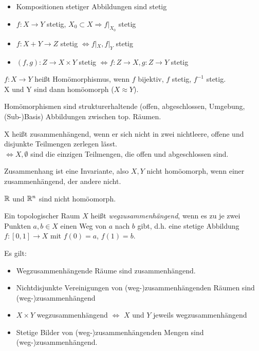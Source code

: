 \begin{bem}
  \begin{itemize}
    \item Kompositionen stetiger Abbildungen sind stetig
    \item $f:X\to Y$ stetig, $X_0 \subset X \Rightarrow f|_{X_0}$ stetig
    \item $f:X+Y\to Z$ stetig $\Leftrightarrow f|_X, f|_Y$ stetig
    \item $(f,g): Z\to X\times Y$ stetig $\Leftrightarrow f:Z\to X, g:Z\to Y$ stetig
  \end{itemize}
\end{bem}

\begin{defi}[Homömorphismus]
  $f:X\to Y$ heißt Homömorphismus, wenn $f$ bijektiv, $f$ stetig, $f^{-1}$ stetig.\\
  X und Y sind dann homöomorph ($X\approx Y$).
\end{defi}

\begin{bem}
  Homömorphismen sind strukturerhaltende (offen, abgeschlossen, Umgebung, (Sub-)Basis) 
  Abbildungen zwischen top. Räumen.
\end{bem}

\begin{defi}[Zusammenhang]
  X heißt zusammenhängend, wenn er sich nicht in zwei nichtleere, offene und
  disjunkte Teilmengen zerlegen lässt.\\
  $\Leftrightarrow X, \emptyset$ sind die einzigen Teilmengen, die offen und abgeschlossen sind.
\end{defi}

\begin{bem}
  Zusammenhang ist eine Invariante, also $X, Y$ nicht homöomorph, 
  wenn einer zusammenhängend, der andere nicht.
\end{bem}

\begin{bsp}
  $\mathbb R$ und $\mathbb R^n$ sind nicht homöomorph.
\end{bsp}

\begin{defi}[Wegzusammenhang]
Ein topologischer Raum $X$ heißt \emph{wegzusammenhängend}, 
wenn es zu je zwei Punkten $a, b \in X$ 
einen Weg von $a$ nach $b$ gibt, 
d.h. eine stetige Abbildung $f: [0, 1] \to X$ mit $f(0) = a$, $f(1) = b$.
\end{defi}

\begin{bem} Es gilt:
\begin{itemize}
\item Wegzusammenhängende Räume sind zusammenhängend.
\item Nichtdisjunkte Vereinigungen von (weg-)zusammenhängenden Räumen sind (weg-)zusammenhängend
\item $X \times Y$ wegzusammenhängend $\Leftrightarrow$ $X$ und $Y$ jeweils wegzusammenhängend
\item Stetige Bilder von (weg-)zusammenhängenden Mengen sind (weg-)zusammenhängend. \\
\end{itemize}
\end{bem}


